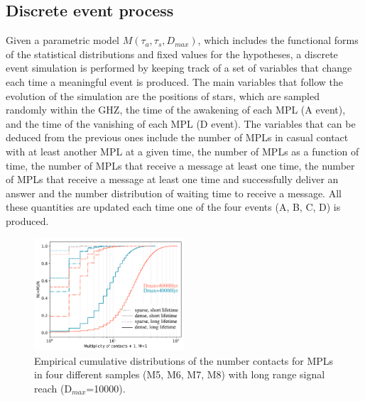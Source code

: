 \documentclass[crop]{CSLB}%
\begin{document}

\subsection{Discrete event process}

Given a parametric model $M(\tau_a, \tau_s, D_{max})$, which includes the
functional forms of the statistical distributions and fixed values for the
hypotheses, a discrete event simulation is performed by keeping track of a set
of variables that change each time a meaningful event is produced.
%
The main variables that follow the evolution of the simulation are the positions
of stars, which are sampled randomly within the GHZ, the time of the awakening
of each MPL (A event), and the time of the vanishing of each MPL (D event).
%
The variables that can be deduced from the previous ones include the number of
MPLs in casual contact with at least another MPL at a given time, the number
of MPLs as a function of time, the number of MPLs that receive a message at
least one time, the number of MPLs that receive a message at least one time and
successfully deliver an answer and the number distribution of waiting time to
receive a message.
%
All these quantities are updated each time one of the four events (A, B, C, D)
is produced.
          
          






                 
\begin{figure} \centering
   \includegraphics[width=0.5\textwidth]{F1.pdf}
   \caption{Empirical cumulative distributions of the number contacts
   for MPLs in four different samples (M5, M6, M7, M8) with long
   range signal reach (D$_{max}$=10000).
   }
\label{F_number_of_contacts} \end{figure}
   
\end{document}
